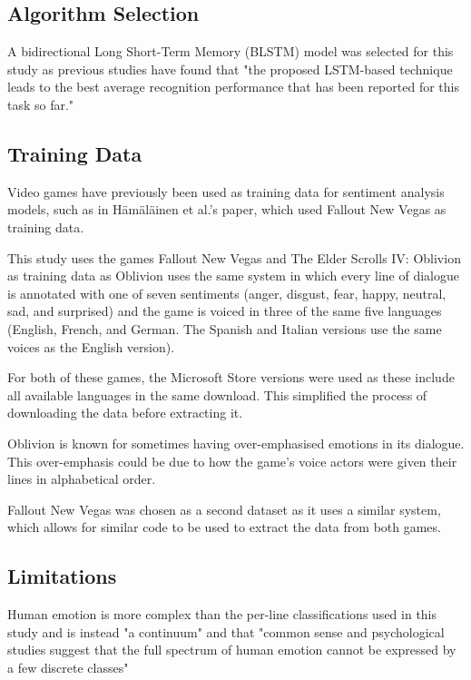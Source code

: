 \documentclass[journal]{IEEEtran}
\begin{document}
\subsection{Algorithm Selection}
A bidirectional Long Short-Term Memory (BLSTM) model was selected for this study as previous studies
have found that "the proposed LSTM-based technique leads to the best average recognition performance
that has been reported for this task so far." \cite{wollmer_lstm-modeling_2013}

\subsection{Training Data}
Video games have previously been used as training data for sentiment analysis models, such as in
Hämäläinen et al.'s paper, \cite{hamalainen_video_2022} which used Fallout New Vegas as training data.

This study uses the games Fallout New Vegas \cite{noauthor_buy_nodate} and
The Elder Scrolls IV: Oblivion \cite{noauthor_elder_nodate} as training data as
Oblivion uses the same system in which every line of dialogue is annotated with one of seven sentiments
(anger, disgust, fear, happy, neutral, sad, and surprised) and the game is voiced in three of the same five languages
(English, French, and German. The Spanish and Italian versions use the same voices as the English version).

For both of these games, the Microsoft Store versions were used as these include all available languages
in the same download. This simplified the process of downloading the data before extracting it.

Oblivion is known for sometimes having over-emphasised emotions in its dialogue.
This over-emphasis could be due to how the game's voice actors were given their lines
in alphabetical order. \cite[1:00]{noclip_-_video_game_documentaries_music_2018}

Fallout New Vegas was chosen as a second dataset as it uses a similar system, which
allows for similar code to be used to extract the data from both games.

\subsection{Limitations}
Human emotion is more complex than the per-line classifications used in this study and is instead
"a continuum" and that "common sense and psychological studies suggest that the full spectrum of
human emotion cannot be expressed by a few discrete classes" \cite{wollmer_abandoning_2008}
\end{document}
